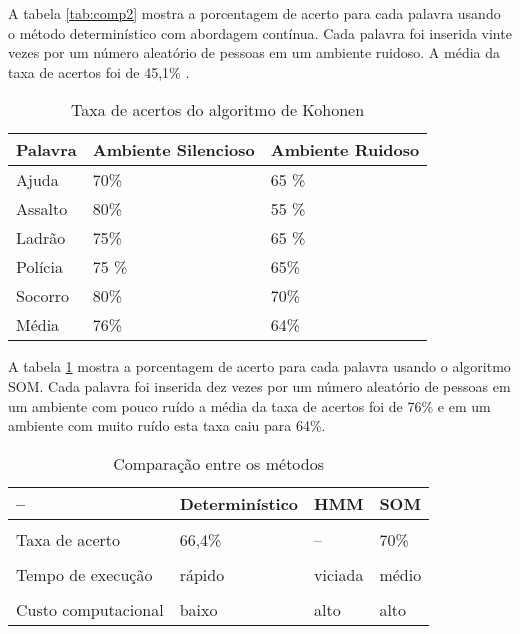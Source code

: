 A tabela \ref{tab:comp2} mostra a porcentagem de acerto para cada palavra usando o método determinístico com abordagem contínua. Cada palavra foi inserida vinte vezes por um número aleatório de pessoas  em um ambiente ruidoso. A média da taxa de acertos foi de 45,1\% .

\begin{table}[H]
\centering
\caption{Taxa de acertos do algoritmo de Kohonen}
\label{tab:comp3}
\smallskip
\begin{tabular}{|l|l|l|}
\hline
 Palavra & Ambiente Silencioso & Ambiente Ruidoso\\
\hline

Ajuda & 70\% &  65 \% \\
\hline

Assalto & 80\% &  55 \% \\
\hline
Ladrão & 75\% &  65 \% \\
\hline

Polícia & 75 \% & 65\% \\
\hline

Socorro & 80\% & 70\% \\
\hline

Média & 76\% & 64\% \\
\hline
\end{tabular}
\end{table}

A tabela \ref{tab:comp3} mostra  a porcentagem de acerto para cada palavra usando o algoritmo SOM. Cada palavra foi inserida dez vezes por um número aleatório de pessoas  em um ambiente com pouco ruído a média da taxa de acertos foi de 76\% e em um ambiente com muito ruído esta taxa caiu para 64\%.

\begin{table}[H]
\centering
\caption{Comparação entre os métodos}
\label{tab:comp5}
\smallskip
\begin{tabular}{|l|l|l|l|}
\hline
 -- & Determinístico & HMM & SOM\\[0.5ex]
\hline
&&&\\[-2ex]
Taxa de acerto & 66,4\% &  -- &  70\%\\[0.5ex]
\hline
&&&\\[-2ex]
Tempo de execução & rápido &  viciada &  médio \\[0.5ex]
\hline
&&&\\[-2ex]
Custo computacional & baixo & alto & alto\\[0.5ex]
\hline
\end{tabular}
\end{table}

